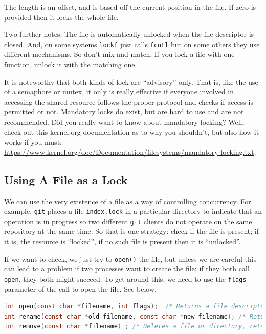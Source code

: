 The length is an offset, and is based off the current position in the file. If zero is provided then it locks the whole file.

Two further notes: The file is automatically unlocked when the file descriptor is closed. And, on some systems \texttt{lockf} just calls \texttt{fcntl} but on some others they use different mechanisms. So don't mix and match. If you lock a file with one function, unlock it with the matching one.

It is noteworthy that both kinds of lock are ``advisory'' only. That is, like the use of a semaphore or mutex, it only is really effective if everyone involved in accessing the shared resource follows the proper protocol and checks if access is permitted or not. Mandatory locks do exist, but are hard to use and are not recommended. Did you really want to know about mandatory locking? Well, check out this kernel.org documentation as to why you shouldn't, but also how it works if you must: \url{https://www.kernel.org/doc/Documentation/filesystems/mandatory-locking.txt}.

\subsection*{Using A File as a Lock}

We can use the very existence of a file as a way of controlling concurrency. For example, \texttt{git} places a file \texttt{index.lock} in a particular directory to indicate that an operation is in progress so two different \texttt{git} clients do not operate on the same repository at the same time. So that is one strategy: check if the file is present; if it is, the resource is ``locked'', if no such file is present then it is ``unlocked''.

If we want to check, we just try to \texttt{open()} the file, but unless we are careful this can lead to a problem if two processes want to create the file: if they both call \texttt{open}, they both might succeed. To get around this, we need to use the \texttt{flags} parameter of the call to open the file. See below.

\begin{lstlisting}[language=C]
int open(const char *filename, int flags);  /* Returns a file descriptor if successful, -1 on error */
int rename(const char *old_filename, const char *new_filename); /* Returns 0 on success , operates atomically */
int remove(const char *filename) ; /* Deletes a file or directory, returns 0 on success, operates atomically */ 
\end{lstlisting}

